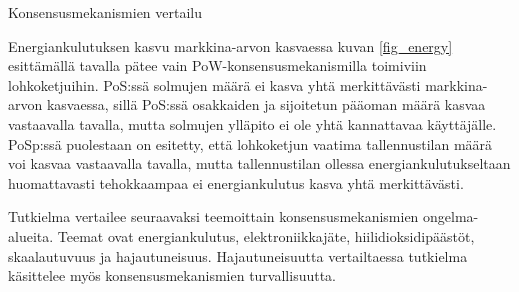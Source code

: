 \begin{chapter}{Konsensusmekanismien vertailu\label{vertailu}}
\begin{otherlanguage}{finnish}

Energiankulutuksen kasvu markkina-arvon kasvaessa kuvan \ref{fig_energy} esittämällä tavalla pätee vain PoW-konsensusmekanismilla toimiviin lohkoketjuihin. PoS:ssä solmujen määrä ei kasva yhtä merkittävästi markkina-arvon kasvaessa, sillä PoS:ssä osakkaiden ja sijoitetun pääoman määrä kasvaa vastaavalla tavalla, mutta solmujen ylläpito ei ole yhtä kannattavaa käyttäjälle. PoSp:ssä puolestaan on esitetty, että lohkoketjun vaatima tallennustilan määrä voi kasvaa vastaavalla tavalla, mutta tallennustilan ollessa energiankulutukseltaan huomattavasti tehokkaampaa ei energiankulutus kasva yhtä merkittävästi.

Tutkielma vertailee seuraavaksi teemoittain konsensusmekanismien ongelma-alueita. Teemat ovat energiankulutus, elektroniikkajäte, hiilidioksidipäästöt, skaalautuvuus ja hajautuneisuus. Hajautuneisuutta vertailtaessa tutkielma käsittelee myös konsensusmekanismien turvallisuutta.






\end{otherlanguage}
\end{chapter}